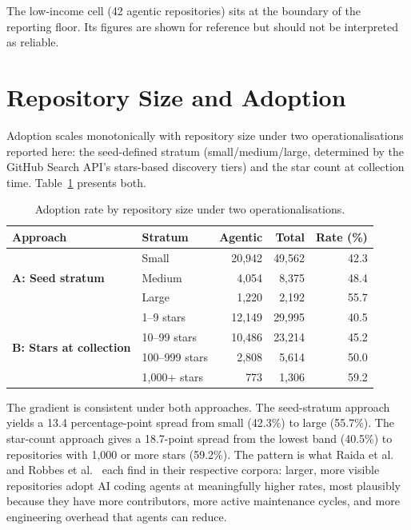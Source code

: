 The low-income cell (42 agentic repositories) sits at the boundary of the reporting floor. Its figures are shown for reference but should not be interpreted as reliable.

\section{Repository Size and Adoption}
\label{sec:res:size}

Adoption scales monotonically with repository size under two operationalisations reported here: the seed-defined stratum (small/medium/large, determined by the GitHub Search API's stars-based discovery tiers) and the star count at collection time. Table~\ref{tab:size_comparison} presents both.

\begin{table}[h]
\centering
\caption{Adoption rate by repository size under two operationalisations.}
\label{tab:size_comparison}
\begin{tabular}{@{}llrrr@{}}
\toprule
Approach & Stratum & Agentic & Total & Rate (\%) \\
\midrule
\multirow{3}{*}{\textbf{A: Seed stratum}}
  & Small  & 20,942 & 49,562 & 42.3 \\
  & Medium &  4,054 &  8,375 & 48.4 \\
  & Large  &  1,220 &  2,192 & 55.7 \\[4pt]
\multirow{4}{*}{\textbf{B: Stars at collection}}
  & 1--9 stars      & 12,149 & 29,995 & 40.5 \\
  & 10--99 stars    & 10,486 & 23,214 & 45.2 \\
  & 100--999 stars  &  2,808 &  5,614 & 50.0 \\
  & 1,000+ stars    &    773 &  1,306 & 59.2 \\
\bottomrule
\end{tabular}
\end{table}

The gradient is consistent under both approaches. The seed-stratum approach yields a 13.4 percentage-point spread from small (42.3\%) to large (55.7\%). The star-count approach gives a 18.7-point spread from the lowest band (40.5\%) to repositories with 1,000 or more stars (59.2\%). The pattern is what Raida et al.~\cite{raida2026} and Robbes et al.~\cite{robbesAgenticMuch2026} each find in their respective corpora: larger, more visible repositories adopt AI coding agents at meaningfully higher rates, most plausibly because they have more contributors, more active maintenance cycles, and more engineering overhead that agents can reduce.

